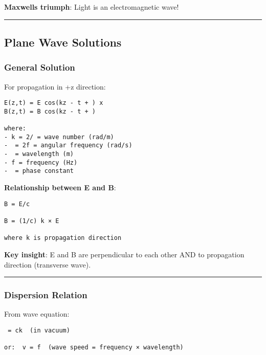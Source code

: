 \textbf{Maxwell\textquotesingle s triumph}: Light is an electromagnetic
wave!

\begin{center}\rule{0.5\linewidth}{0.5pt}\end{center}

\subsection{\texorpdfstring{ Plane Wave
Solutions}{ Plane Wave Solutions}}\label{plane-wave-solutions}

\subsubsection{General Solution}\label{general-solution}

For propagation in +z direction:

\begin{verbatim}
E(z,t) = E cos(kz - t + ) x
B(z,t) = B cos(kz - t + ) 

where:
- k = 2/ = wave number (rad/m)
-  = 2f = angular frequency (rad/s)
-  = wavelength (m)
- f = frequency (Hz)
-  = phase constant
\end{verbatim}

\textbf{Relationship between E and B}:

\begin{verbatim}
B = E/c

B = (1/c) k × E

where k is propagation direction
\end{verbatim}

\textbf{Key insight}: E and B are perpendicular to each other AND to
propagation direction (transverse wave).

\begin{center}\rule{0.5\linewidth}{0.5pt}\end{center}

\subsubsection{Dispersion Relation}\label{dispersion-relation}

From wave equation:

\begin{verbatim}
 = ck  (in vacuum)

or:  v = f  (wave speed = frequency × wavelength)
\end{verbatim}

